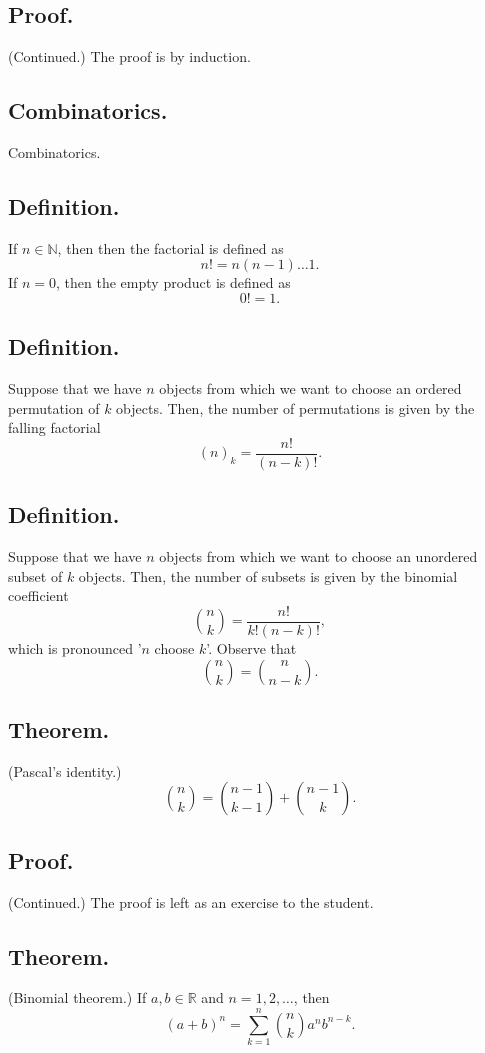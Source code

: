 \documentclass[titlepage]{article}
\begin{document}
\subsection{Proof.} (Continued.) The proof is by induction.

\newpage {}

\subsection{Combinatorics.} Combinatorics.

\subsection{Definition.} If $n \in \mathbb{N}$, then then the factorial is defined as 
$$n! = n(n-1)\ldots1.$$
If $n = 0$, then the empty product is defined as 
$$0! = 1.$$

\subsection{Definition.} Suppose that we have $n$ objects from which we want to choose an ordered permutation of $k$ objects. Then, the number of permutations is given by the falling factorial 
$$(n)_{k} = \frac{n!}{(n-k)!}.$$

\subsection{Definition.} Suppose that we have $n$ objects from which we want to choose an unordered subset of $k$ objects. Then, the number of subsets is given by the binomial coefficient 
$$\binom{n}{k} = \frac{n!}{k!(n-k)!},$$
which is pronounced '$n$ choose $k$'. Observe that 
$$\binom{n}{k} = \binom{n}{n-k}.$$

\subsection{Theorem.} (Pascal's identity.) 
$$\binom{n}{k} = \binom{n-1}{k-1} + \binom{n-1}{k}.$$

\subsection{Proof.} (Continued.) The proof is left as an exercise to the student.

\subsection{Theorem.} (Binomial theorem.) If $a, b \in \mathbb{R}$ and $n = 1, 2, \ldots$, then 
$$(a + b)^{n} = \sum_{k=1}^{n}\binom{n}{k}a^{n}b^{n-k}.$$
\end{document}
